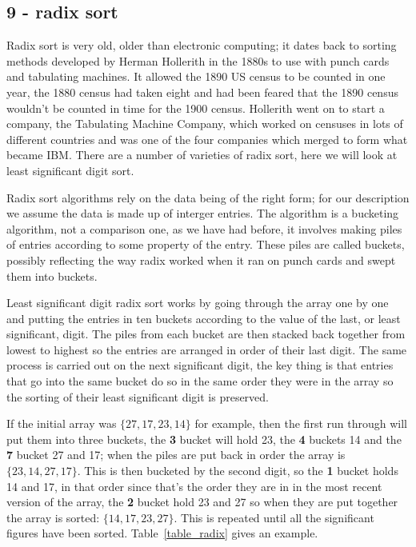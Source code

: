\documentclass[11pt,a4paper]{scrartcl}
\begin{document}
\subsection*{9 - radix sort}

Radix sort is very old, older than electronic computing; it dates back
to sorting methods developed by Herman Hollerith in the 1880s to use
with punch cards and tabulating machines. It allowed the 1890 US
census to be counted in one year, the 1880 census had taken eight and
had been feared that the 1890 census wouldn't be counted in time for
the 1900 census. Hollerith went on to start a company, the Tabulating
Machine Company, which worked on censuses in lots of different
countries and was one of the four companies which merged to form what
became IBM. There are a number of varieties of radix sort, here we
will look at least significant digit sort.

Radix sort algorithms rely on the data being of the right form; for
our description we assume the data is made up of interger entries. The
algorithm is a bucketing algorithm, not a comparison one, as we have
had before, it involves making piles of entries according to some
property of the entry. These piles are called buckets, possibly
reflecting the way radix worked when it ran on punch cards and swept
them into buckets.

Least significant digit radix sort works by going through the array
one by one and putting the entries in ten buckets according to the
value of the last, or least significant, digit. The piles from each
bucket are then stacked back together from lowest to highest so the
entries are arranged in order of their last digit. The same process is
carried out on the next significant digit, the key thing is that
entries that go into the same bucket do so in the same order they were
in the array so the sorting of their least significant digit is
preserved. 

If the initial array was $\{27,17,23,14\}$ for example, then the first
run through will put them into three buckets, the {\bf 3} bucket will
hold 23, the {\bf 4} buckets 14 and the {\bf 7} bucket 27 and 17; when
the piles are put back in order the array is $\{23,14,27,17\}$. This
is then bucketed by the second digit, so the {\bf 1} bucket holds 14
and 17, in that order since that's the order they are in in the most
recent version of the array, the {\bf 2} bucket hold 23 and 27 so when
they are put together the array is sorted: $\{14,17,23,27\}$. This is
repeated until all the significant figures have been
sorted. Table~\ref{table_radix} gives an example.
\end{document}
